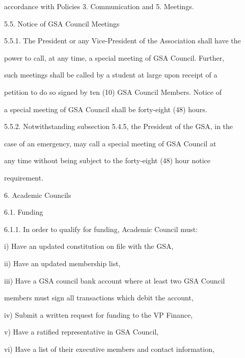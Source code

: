         accordance with Policies 3. Communication and 5. Meetings.  



5.5.         Notice of GSA Council Meetings  



5.5.1. The President or any Vice-President of the Association shall have the  

        power to call, at any time, a special meeting of GSA Council. Further,  

        such meetings shall be called by a student at large upon receipt of a  

        petition to do so signed by ten (10) GSA Council Members. Notice of  

        a special meeting of GSA Council shall be forty-eight (48) hours.  



5.5.2. Notwithstanding  subsection  5.4.5,  the  President  of  the  GSA,  in  the  

        case of an emergency, may call a special meeting of GSA Council at  

        any  time  without  being  subject  to  the  forty-eight  (48)  hour  notice  

        requirement.  



6.  Academic Councils  



6.1.        Funding  



6.1.1. In order to qualify for funding, Academic Council must:  



i)      Have an updated constitution on file with the GSA,  



ii)     Have an updated membership list,  



iii)    Have  a  GSA  council  bank  account  where  at  least  two  GSA  Council  

        members must sign all transactions which debit the account,  



iv)     Submit a written request for funding to the VP Finance,  



v)      Have a ratified representative in GSA Council,  



vi)     Have a list of their executive members and contact information,  



